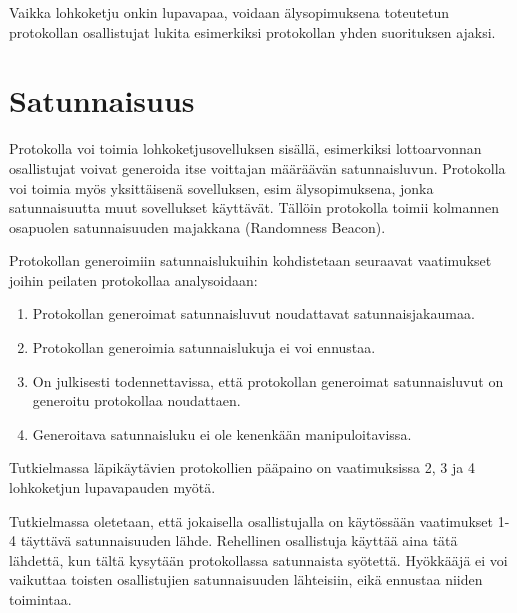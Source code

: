 Vaikka lohkoketju onkin lupavapaa, voidaan älysopimuksena toteutetun protokollan osallistujat lukita esimerkiksi protokollan yhden suorituksen ajaksi.

\section{Satunnaisuus}

Protokolla voi toimia lohkoketjusovelluksen sisällä, esimerkiksi lottoarvonnan osallistujat voivat generoida itse voittajan määräävän satunnaisluvun. Protokolla voi toimia myös yksittäisenä sovelluksen, esim älysopimuksena, jonka satunnaisuutta muut sovellukset käyttävät. Tällöin protokolla toimii kolmannen osapuolen satunnaisuuden majakkana (Randomness Beacon).

Protokollan generoimiin satunnaislukuihin kohdistetaan seuraavat vaatimukset joihin peilaten protokollaa analysoidaan:
\begin{enumerate}
    \item Protokollan generoimat satunnaisluvut noudattavat satunnaisjakaumaa.
    \item Protokollan generoimia satunnaislukuja ei voi ennustaa.
    \item On julkisesti todennettavissa, että protokollan generoimat satunnaisluvut on generoitu protokollaa noudattaen.
    \item Generoitava satunnaisluku ei ole kenenkään manipuloitavissa.
\end{enumerate}

Tutkielmassa läpikäytävien protokollien pääpaino on vaatimuksissa 2, 3 ja 4 lohkoketjun lupavapauden myötä. 

Tutkielmassa oletetaan, että jokaisella osallistujalla on käytössään vaatimukset 1-4 täyttävä satunnaisuuden lähde. Rehellinen osallistuja käyttää aina tätä lähdettä, kun tältä kysytään protokollassa satunnaista syötettä. Hyökkääjä ei voi vaikuttaa toisten osallistujien satunnaisuuden lähteisiin, eikä ennustaa niiden toimintaa.

